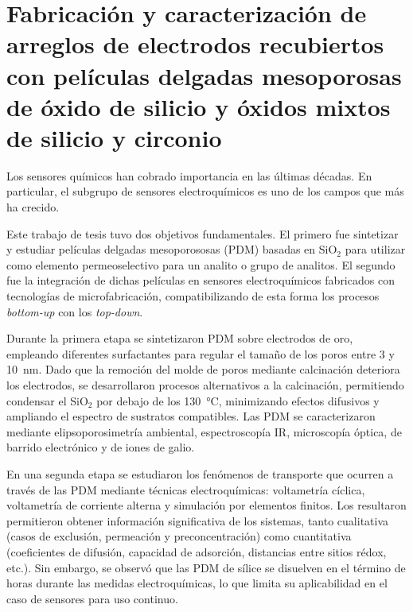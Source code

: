 \cleardoublepage

\mtcaddchapter[Resumen]

\section*{\centering\large{\bfseries{Fabricación y caracterización de arreglos de electrodos recubiertos con películas delgadas mesoporosas de óxido de silicio y óxidos mixtos de silicio y circonio}}}

\vspace*{\fill}

Los sensores químicos han cobrado importancia en las últimas décadas. En particular, el subgrupo de sensores electroquímicos es uno de los campos que más ha crecido. 

Este trabajo de tesis tuvo dos objetivos fundamentales. El primero fue sintetizar y estudiar películas delgadas mesoporososas (PDM) basadas en SiO$_2$ para utilizar como elemento permeoselectivo para un analito o grupo de analitos. El segundo fue la integración de dichas películas en sensores electroquímicos fabricados con tecnologías de microfabricación, compatibilizando de esta forma los procesos \textit{bottom-up} con los \textit{top-down}.

Durante la primera etapa se sintetizaron PDM sobre electrodos de oro, empleando diferentes surfactantes para regular el tamaño de los poros entre 3 y \SI{10}{\nm}. Dado que la remoción del molde de poros mediante calcinación deteriora los electrodos, se desarrollaron procesos alternativos a la calcinación, permitiendo condensar el SiO$_2$ por debajo de los \SI{130}{\celsius}, minimizando efectos difusivos y ampliando el espectro de sustratos compatibles. Las PDM se caracterizaron mediante elipsoporosimetría ambiental, espectroscopía IR, microscopía óptica, de barrido electrónico y de iones de galio.

En una segunda etapa se estudiaron los fenómenos de transporte que ocurren a través de las PDM mediante técnicas electroquímicas: voltametría cíclica, voltametría de corriente alterna y simulación por elementos finitos. Los resultaron permitieron obtener información significativa de los sistemas, tanto cualitativa (casos de exclusión, permeación y preconcentración) como cuantitativa (coeficientes de difusión, capacidad de adsorción, distancias entre sitios rédox, etc.). Sin embargo, se observó que las PDM de sílice se disuelven en el término de horas durante las medidas electroquímicas, lo que limita su aplicabilidad en el caso de sensores para uso continuo.

